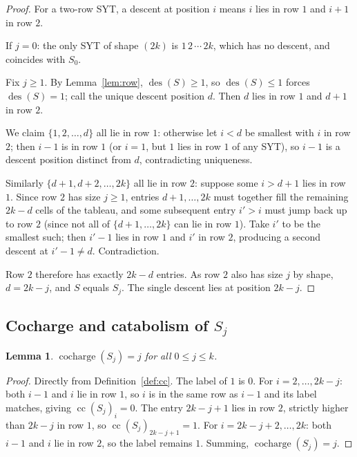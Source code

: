 \documentclass[11pt]{article}
\newtheorem{lemma}[theorem]{Lemma}
\theoremstyle{definition}
\theoremstyle{remark}
\DeclareMathOperator{\cocharge}{cocharge}
\DeclareMathOperator{\cc}{cc}
\DeclareMathOperator{\des}{des}
\begin{document}
\begin{proof}
For a two-row SYT, a descent at position $i$ means $i$ lies in row $1$ and
$i+1$ in row $2$.

If $j = 0$: the only SYT of shape $(2k)$ is $1\,2\,\cdots\,2k$, which has no
descent, and coincides with $S_0$.

Fix $j \ge 1$. By Lemma~\ref{lem:row}, $\des(S) \ge 1$, so $\des(S) \le 1$
forces $\des(S) = 1$; call the unique descent position $d$. Then $d$ lies in
row $1$ and $d+1$ in row $2$.

We claim $\{1, 2, \ldots, d\}$ all lie in row $1$: otherwise let $i < d$ be
smallest with $i$ in row $2$; then $i - 1$ is in row $1$ (or $i = 1$, but $1$
lies in row $1$ of any SYT), so $i - 1$ is a descent position distinct from
$d$, contradicting uniqueness.

Similarly $\{d+1, d+2, \ldots, 2k\}$ all lie in row $2$: suppose some $i > d+1$
lies in row $1$. Since row $2$ has size $j \ge 1$, entries $d+1, \ldots, 2k$
must together fill the remaining $2k - d$ cells of the tableau, and some
subsequent entry $i' > i$ must jump back up to row $2$ (since not all of
$\{d+1,\ldots,2k\}$ can lie in row $1$). Take $i'$ to be the smallest such;
then $i' - 1$ lies in row $1$ and $i'$ in row $2$, producing a second descent
at $i' - 1 \ne d$. Contradiction.

Row $2$ therefore has exactly $2k - d$ entries. As row $2$ also has size $j$
by shape, $d = 2k - j$, and $S$ equals $S_j$. The single descent lies at
position $2k - j$.
\end{proof}

\subsection*{Cocharge and catabolism of $S_j$}

\begin{lemma}\label{lem:cc}
$\cocharge(S_j) = j$ for all $0 \le j \le k$.
\end{lemma}

\begin{proof}
Directly from Definition~\ref{def:cc}. The label of $1$ is $0$. For
$i = 2, \ldots, 2k-j$: both $i-1$ and $i$ lie in row $1$, so $i$ is in the
same row as $i-1$ and its label matches, giving $\cc(S_j)_{i} = 0$. The
entry $2k - j + 1$ lies in row $2$, strictly higher than $2k-j$ in row $1$,
so $\cc(S_j)_{2k-j+1} = 1$. For $i = 2k-j+2, \ldots, 2k$: both $i-1$ and $i$
lie in row $2$, so the label remains $1$. Summing, $\cocharge(S_j) = j$.
\end{proof}
\end{document}
